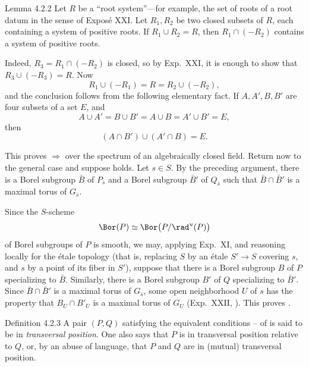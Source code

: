 \begin{sgastatement}{Lemma 4.2.2}
Let \(R\) be a ``root system''---for example, the set of roots of a root
datum in the sense of Exposé XXI.  Let \(R_1,R_2\) be two closed subsets
of \(R\), each containing a system of positive roots.  If
\(R_1\cup R_2=R\), then \(R_1\cap(-R_2)\) contains a system of positive
roots.
\end{sgastatement}

Indeed, \(R_3=R_1\cap(-R_2)\) is closed, so by Exp.\ XXI,  it is
enough to show that \(R_3\cup(-R_3)=R\).  Now
\[
 R_1\cup(-R_1)=R=R_2\cup(-R_2),
\]
and the conclusion follows from the following elementary fact.  If
\(A,A',B,B'\) are four subsets of a set \(E\), and
\[
 A\cup A'=B\cup B'=A\cup B=A'\cup B'=E,
\]
then
\[
 (A\cap B')\cup(A'\cap B)=E.
\]

This proves \textup{} \(\Rightarrow\) \textup{} over the
spectrum of an algebraically closed field.  Return now to the general
case and suppose \textup{} holds.  Let \(s\in S\).  By the preceding
argument, there is a Borel subgroup \(\bar B\) of \(P_{\bar s}\) and a
Borel subgroup \(\bar B'\) of \(Q_{\bar s}\) such that
\(\bar B\cap\bar B'\) is a maximal torus of \(G_{\bar s}\).

Since the \(S\)-scheme
\[
 \Bor(P)\simeq\Bor\bigl(P/\rad^u(P)\bigr)
\]
of Borel subgroups of \(P\) is smooth, we may, applying Exp.\ XI,
 and reasoning locally for the étale topology (that is, replacing
\(S\) by an étale \(S'\to S\) covering \(s\), and \(s\) by a point of its
fiber in \(S'\)), suppose that there is a Borel subgroup \(B\) of \(P\)
specializing to \(\bar B\).  Similarly, there is a Borel subgroup \(B'\) of \(Q\)
specializing to \(\bar B'\).  Since
\(\bar B\cap\bar B'\) is a maximal torus of \(G_{\bar s}\), some open
neighborhood \(U\) of \(s\) has the property that
\(B_U\cap B'_U\) is a maximal torus of \(G_U\)
(Exp.\ XXII, ).  This proves \textup{}.
\SGAQED

\begin{sgastatement}{Definition 4.2.3}
A pair \((P,Q)\) satisfying the equivalent conditions
\textup{}--\textup{} of  is said to be in
\emph{transversal position}.  One also says that \(P\) is in
transversal position relative to \(Q\), or, by an abuse of language,
that \(P\) and \(Q\) are in (mutual) transversal position.
\end{sgastatement}

